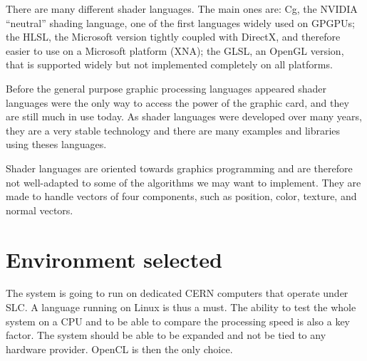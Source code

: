 There are many different shader languages. The main ones are: Cg, the NVIDIA ``neutral'' shading language, one of the first languages widely used on \glspl{GPGPU}; the \gls{HLSL}, the Microsoft version tightly coupled with DirectX, and therefore easier to use on a Microsoft platform (XNA); the \gls{GLSL}, an \gls{OpenGL} version, that is supported widely but not implemented completely on all platforms. 

Before the general purpose graphic processing languages appeared shader languages were the only way to access the power of the graphic card, and they are still much in use today. As shader languages were developed over many years, they are a very stable technology and there are many examples and libraries using theses languages.

Shader languages are oriented towards graphics programming and are therefore not well-adapted to some of the algorithms we may want to implement. They are made to handle vectors of four components, such as position, color, texture, and normal vectors.

\section{Environment selected}

The system is going to run on dedicated \gls{CERN} computers that operate under \gls{SLC}. A language running on Linux is thus a must. The ability to test the whole system on a \gls{CPU} and to be able to compare the processing speed is also a key factor. The system should be able to be expanded and not be tied to any hardware provider. \Gls{OpenCL} is then the only choice.

